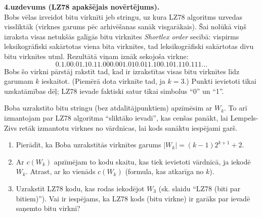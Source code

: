 \documentclass[a4paper,12pt]{article}
\begin{document}



\vspace{10pt}
{\bf 4.uzdevums (LZ78 apakšējais novērtējums).}\\
Bobs vēlas izveidot bitu virknīti jeb stringu, uz kura 
LZ78 algoritms uzvedas vissliktāk (virknes garums pēc arhivēšanas sanāk visgarākais).
Šai nolūkā viņš izraksta visas netukšās galīgās bitu virknītes {\em Shortlex order} secībā:
vispirms leksikogrāfiski sakārtotas viena bita virknītes, tad leksikogrāfiski sakārtotas
divu bitu virknītes utml. Rezultātā viņam iznāk sekojoša virkne:
$$\mathtt{0.1.00.01.10.11.000.001.010.011.100.101.110.111}\ldots$$
Bobs šo virkni pārstāj rakstīt tad, kad ir izrakstītas visas bitu virknītes līdz garumam $k$ ieskaitot. 
(Piemērā dota virknīte tad, ja $k=3$.) Punkti ievietoti tikai uzskatāmības dēļ; LZ78 
ievade faktiski satur tikai simbolus ``0'' un ``1''.

Boba uzrakstīto bitu stringu (bez atdalītājpunktiem) apzīmēsim ar $W_k$. 
To arī izmantojam par LZ78 algoritma ``sliktāko ievadi'', 
kas cenšas panākt, lai Lempels-Zivs retāk
izmantotu virknes no vārdnīcas, lai kods sanāktu iespējami garš.

\begin{enumerate}
\item Pierādīt, ka Boba uzrakstītās virknītes garums $|W_k| = (k-1)2^{k+1} + 2$.
\item Ar $c(W_k)$ apzīmējam to kodu skaitu, kas tiek ievietoti vārdnīcā, ja iekodē $W_k$. 
Atrast, ar ko vienāds $c(W_k)$ (formula, kas atkarīga no $k$).
\item Uzrakstīt LZ78 kodu, kas rodas iekodējot $W_3$ (sk. slaidu ``LZ78 (biti par bitiem)''). 
Vai ir iespējams, ka LZ78 kods (bitu virkne) ir garāks par ievadē saņemto bitu virkni?
\end{enumerate}
\end{document}
